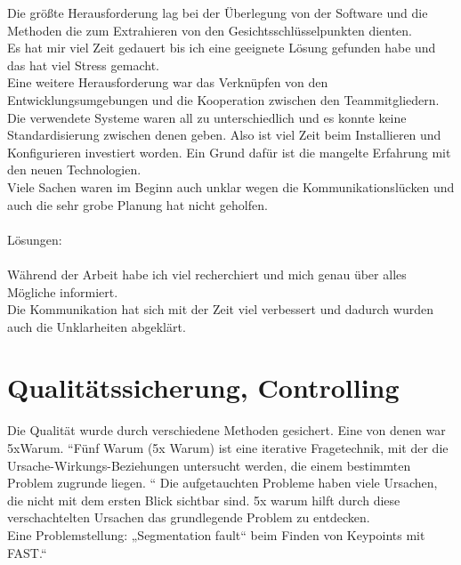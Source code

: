 Die größte Herausforderung lag bei der Überlegung von der Software und die Methoden die zum Extrahieren von den Gesichtsschlüsselpunkten dienten.\\
 Es hat mir viel Zeit gedauert bis ich eine geeignete Lösung gefunden habe und das hat viel Stress gemacht. \\
Eine weitere Herausforderung war das Verknüpfen von den Entwicklungsumgebungen  und die Kooperation zwischen den Teammitgliedern. \\
Die verwendete Systeme waren all zu unterschiedlich und es konnte keine Standardisierung zwischen denen geben. Also ist viel Zeit beim Installieren und Konfigurieren investiert worden. Ein Grund dafür ist die mangelte Erfahrung mit den neuen Technologien. \\
Viele Sachen waren im Beginn auch unklar wegen die Kommunikationslücken und auch die sehr grobe Planung hat nicht geholfen. \\\\

Lösungen: \\\\
Während der Arbeit habe ich viel recherchiert und mich genau über alles Mögliche informiert. \\
Die Kommunikation hat sich mit der Zeit viel verbessert und dadurch wurden auch die Unklarheiten abgeklärt. \\

\section{Qualitätssicherung, Controlling}
Die Qualität wurde durch verschiedene Methoden gesichert. Eine von denen war 5xWarum. 
“Fünf Warum (5x Warum) ist eine iterative Fragetechnik, mit der die Ursache-Wirkungs-Beziehungen untersucht werden, die einem bestimmten Problem zugrunde liegen. “
\cite{fmea}
Die aufgetauchten Probleme haben viele Ursachen, die nicht mit dem ersten Blick sichtbar sind. 5x warum hilft durch diese verschachtelten Ursachen das grundlegende Problem zu entdecken. \\
Eine Problemstellung: „Segmentation fault“ beim Finden von Keypoints mit FAST.“\\ 

